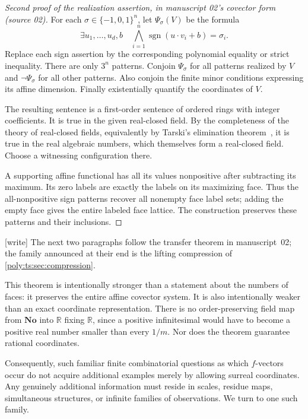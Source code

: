 \documentclass[11pt,a4paper]{article}
\numberwithin{equation}{section}
\theoremstyle{plain}
\newcommand{\wtag}{\textup{[write]}}%
\newcommand{\No}{\mathbf{No}}
\newcommand{\R}{\mathbb R}
\newcommand{\sgn}{\operatorname{sgn}}
\begin{document}
\begin{proof}[Second proof of the realization assertion, in manuscript 02's covector form (source 02)]
For each $\sigma\in\{-1,0,1\}^n$, let $\Psi_\sigma(V)$ be the formula
\[
 \exists u_1,\ldots,u_d,b\quad
 \bigwedge_{i=1}^n
 \sgn(u\cdot v_i+b)=\sigma_i.
\]
Replace each sign assertion by the corresponding polynomial equality or
strict inequality. There are only $3^n$ patterns. Conjoin $\Psi_\sigma$ for
all patterns realized by $V$ and $\neg\Psi_\sigma$ for all other patterns.
Also conjoin the finite minor conditions expressing its affine dimension.
Finally existentially quantify the coordinates of $V$.

The resulting sentence is a first-order sentence of ordered rings with
integer coefficients. It is true in the given real-closed field. By the
completeness of the theory of real-closed fields, equivalently by Tarski's
elimination theorem~\cite{ts:vdD}, it is true in the real algebraic numbers,
which themselves form a real-closed field. Choose a witnessing configuration
there.

A supporting affine functional has all its values nonpositive after
subtracting its maximum. Its zero labels are exactly the labels on its
maximizing face. Thus the all-nonpositive sign patterns recover all
nonempty face label sets; adding the empty face gives the entire labeled
face lattice. The construction preserves these patterns and their
inclusions.
\end{proof}

\noindent\wtag{} The next two paragraphs follow the transfer theorem in
manuscript~02; the family announced at their end is the lifting compression
of \cref{poly:ts:sec:compression}.\par
This theorem is intentionally stronger than a statement about the numbers
of faces: it preserves the entire affine covector system. It is also
intentionally weaker than an exact coordinate representation. There is no
order-preserving field map from $\No$ into $\R$ fixing $\R$, since a positive
infinitesimal would have to become a positive real number smaller than every
$1/m$. Nor does the theorem guarantee rational coordinates.

Consequently, such familiar finite combinatorial questions as which
$f$-vectors occur do not acquire additional examples merely by allowing
surreal coordinates. Any genuinely additional information must reside in
scales, residue maps, simultaneous structures, or infinite families of
observations. We turn to one such family.
\end{document}
